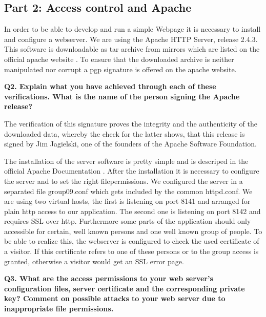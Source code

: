 \subsection {Part 2: Access control and Apache}


\noindent
In order to be able to develop and run a simple Webpage it is necessary to install and configure a webserver. 
We are using  the Apache HTTP Server, release 2.4.3. This software is downloadable as tar archive from mirrors 
which are listed on the official apache website \cite{quelle1}. To ensure that the downloaded archive is neither manipulated 
nor corrupt a pgp signature is offered on the apache website. 
\newline

\noindent
{\bf Q2. Explain what you have achieved through each of these verifications.
What is the name of the person signing the Apache release?}
\newline

\noindent
The verification of this signature proves the integrity and the authenticity of the downloaded data, 
whereby the check for the latter shows, that this release is signed by Jim Jagielski, 
one of the founders of the Apache Software Foundation. 
\newline

\noindent
The installation of the server software is pretty simple and is descriped in the official Apache Documentation \cite{quelle2}.
After the installation it is necessary to configure the server and to set the right filepermissions. 
We configured the server in a separated file group09.conf which gets included by the common httpd.conf. 
We are using two virtual hosts, the first is listening on port 8141 and arranged for plain http access to our application.
The second one is listening on port 8142 and requires SSL over http. 
Furthermore some parts of the application should only accessible for certain, 
well known persons and one well known group of people. To be able to realize this, 
the webserver is configured to check the used certificate of a visitor. 
If this certificate refers to one of these persons or to the group access is granted, 
otherwise a visitor would get an SSL error page. 
\newline

\noindent
{\bf Q3. What are the access permissions to your web server’s configuration files,
server certificate and the corresponding private key? Comment on possible
attacks to your web server due to inappropriate file permissions.}
\newline

